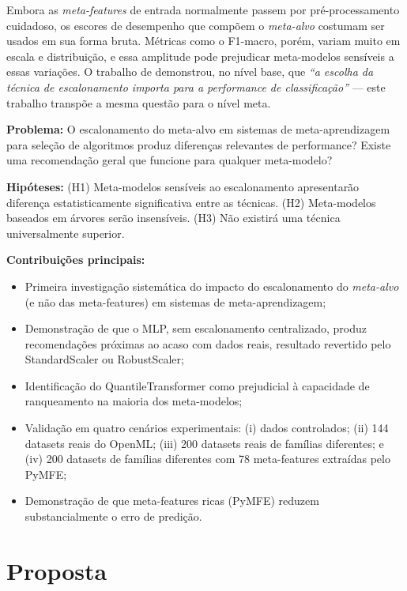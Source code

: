 \documentclass[12pt]{article}
\begin{document}
Embora as \textit{meta-features} de entrada normalmente passem por pré-processamento cuidadoso, os escores de desempenho que compõem o \textit{meta-alvo} costumam ser usados em sua forma bruta. Métricas como o F1-macro, porém, variam muito em escala e distribuição, e essa amplitude pode prejudicar meta-modelos sensíveis a essas variações. O trabalho de \cite{amorim2022choice} demonstrou, no nível base, que \textit{``a escolha da técnica de escalonamento importa para a performance de classificação''} --- este trabalho transpõe a mesma questão para o nível meta.

\textbf{Problema:} O escalonamento do meta-alvo em sistemas de meta-aprendizagem para seleção de algoritmos produz diferenças relevantes de performance? Existe uma recomendação geral que funcione para qualquer meta-modelo?

\textbf{Hipóteses:} (H1) Meta-modelos sensíveis ao escalonamento apresentarão diferença estatisticamente significativa entre as técnicas. (H2) Meta-modelos baseados em árvores serão insensíveis. (H3) Não existirá uma técnica universalmente superior.

\textbf{Contribuições principais:}
\begin{itemize}
  \item Primeira investigação sistemática do impacto do escalonamento do \textit{meta-alvo} (e não das meta-features) em sistemas de meta-aprendizagem;
  \item Demonstração de que o MLP, sem escalonamento centralizado, produz recomendações próximas ao acaso com dados reais, resultado revertido pelo StandardScaler ou RobustScaler;
  \item Identificação do QuantileTransformer como prejudicial à capacidade de ranqueamento na maioria dos meta-modelos;
  \item Validação em quatro cenários experimentais: (i) dados controlados; (ii) 144 datasets reais do OpenML; (iii) 200 datasets reais de famílias diferentes; e (iv) 200 datasets de famílias diferentes com 78 meta-features extraídas pelo PyMFE;
  \item Demonstração de que meta-features ricas (PyMFE) reduzem substancialmente o erro de predição.
\end{itemize}

\section{Proposta}
\end{document}
